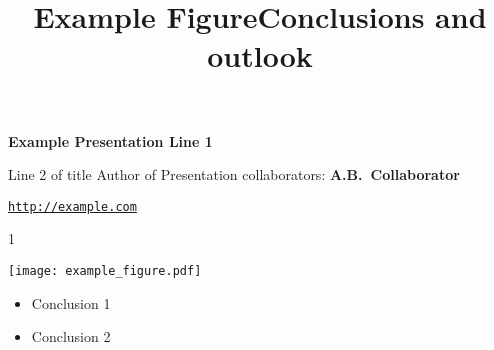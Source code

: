 \documentclass{ian-presentation}
\begin{document}
\pagestyle{empty}
\hbox{}\vfil
\bf\Large
\hfil Example Presentation Line 1\par
\hfil Line 2 of title
\vfil
\large
\hfil Author of Presentation
\normalsize
\vfil
\rm
\hfil collaborators: {\bf A.B.\-~Collaborator}\par
\vfil
\hfill{\tt \href{http://example.com}{http://example.com}}
\eject

\setcounter{page}1
\pagestyle{plain}

\title{Example Figure}

\hfil\texttt{[image: example\_figure.pdf]}
\vfill
\eject

\title{Conclusions and outlook}
\begin{itemize}
  \item Conclusion 1
  \item Conclusion 2
\end{itemize}
\vfill
\end{document}

